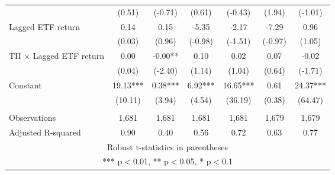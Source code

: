 \documentclass[]{article}
\begin{document}
\begin{tabular}{lcccccc}
 & (0.51) & (-0.71) & (0.61) & (-0.43) & (1.94) & (-1.01) \\
Lagged ETF return & 0.14 & 0.15 & -5.35 & -2.17 & -7.29 & 0.96 \\
 & (0.03) & (0.96) & (-0.98) & (-1.51) & (-0.97) & (1.05) \\
TII $\times$ Lagged ETF return & 0.00 & -0.00** & 0.10 & 0.02 & 0.07 & -0.02 \\
 & (0.04) & (-2.40) & (1.14) & (1.04) & (0.64) & (-1.71) \\
Constant & 19.13*** & 0.38*** & 6.92*** & 16.65*** & 0.61 & 24.37*** \\
 & (10.11) & (3.94) & (4.54) & (36.19) & (0.38) & (64.47) \\
 &  &  &  &  &  &  \\
Observations & 1,681 & 1,681 & 1,681 & 1,681 & 1,679 & 1,679 \\
 Adjusted R-squared & 0.90 & 0.40 & 0.56 & 0.72 & 0.63 & 0.77 \\ \hline
\multicolumn{7}{c}{ Robust t-statistics in parentheses} \\
\multicolumn{7}{c}{ *** p$<$0.01, ** p$<$0.05, * p$<$0.1} \\
\end{tabular}
\end{document}
